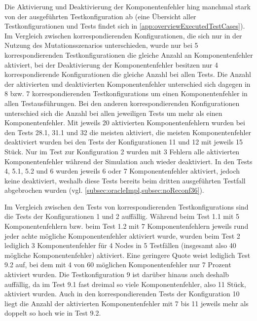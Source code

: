 Die Aktivierung und Deaktivierung der Komponentenfehler hing manchmal stark von der ausgeführten \gls{Testkonfiguration} ab (eine Übersicht aller Testkonfigurationen und Tests findet sich in \cref{app:overviewExecutedTestCases}).
Im Vergleich zwischen korrespondierenden Konfigurationen, die sich nur in der Nutzung des Mutationsszenarios unterschieden, wurde nur bei 5 korrespondierenden Testkonfigurationen die gleiche Anzahl an Komponentenfehler aktiviert, bei der Deaktivierung der Komponentenfehler besitzen nur 4 korrespondierende Konfigurationen die gleiche Anzahl bei allen Tests.
Die Anzahl der aktivierten und deaktivierten Komponentenfehler unterschied sich dagegen in 8 bzw. 7 korrespondierenden \glspl{Testkonfiguration} um einen Komponentenfehler in allen Testausführungen.
Bei den anderen korrespondierenden Konfigurationen unterschied sich die Anzahl bei allen jeweiligen \glspl{Test} um mehr als einen Komponentenfehler.
Mit jeweils 20 aktivierten Komponentenfehlern wurden bei den \glspl{Test} 28.1, 31.1 und 32 die meisten aktiviert, die meisten Komponentenfehler deaktiviert wurden bei den \glspl{Test} der Konfigurationen 11 und 12 mit jeweils 15 Stück.
Nur im \gls{Test} zur Konfiguration 2 wurden mit 3 Fehlern alle aktivierten Komponentenfehler während der Simulation auch wieder deaktiviert.
In den \glspl{Test} 4, 5.1, 5.2 und 6 wurden jeweils 6 oder 7 Komponentenfehler aktiviert, jedoch keine deaktiviert, weshalb diese \glspl{Test} bereits beim dritten ausgeführten \gls{Testfall} abgebrochen wurden (vgl. \cref{subsec:oracleImpl,subsec:noReconf36}).

Im Vergleich zwischen den \glspl{Test} von korrespondierenden \glspl{Testkonfiguration} sind die \glspl{Test} der Konfigurationen 1 und 2 auffällig.
Während beim \gls{Test} 1.1 mit 5 Komponentenfehlern bzw. beim \gls{Test} 1.2 mit 7 Komponentenfehlern jeweils rund jeder achte mögliche Komponentenfehler aktiviert wurde, wurden beim \gls{Test} 2 lediglich 3 Komponentenfehler für 4 Nodes in 5 Testfällen (insgesamt also 40 mögliche Komponentenfehler) aktiviert.
Eine geringere Quote weist lediglich \gls{Test} 9.2 auf, bei dem mit 4 von 60 möglichen Komponentenfehler nur 7 Prozent aktiviert wurden.
Die \gls{Testkonfiguration} 9 ist darüber hinaus auch deshalb auffällig, da im \gls{Test} 9.1 fast dreimal so viele Komponentenfehler, also 11 Stück, aktiviert wurden.
Auch in den korrespondierenden \glspl{Test} der Konfiguration 10 liegt die Anzahl der aktivierten Komponentenfehler mit 7 bis 11 jeweils mehr als doppelt so hoch wie in \gls{Test} 9.2.

